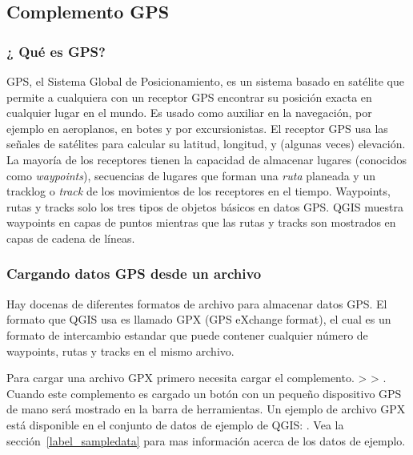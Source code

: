 
\subsection{Complemento GPS}\label{label_plugingps}


\subsubsection{¿ Qué es GPS?}\label{whatsgps}

GPS, el Sistema Global de Posicionamiento, es un sistema basado en satélite que permite a cualquiera con un receptor GPS encontrar su posición exacta en cualquier lugar en el mundo.
Es usado como auxiliar en la navegación, por ejemplo en aeroplanos, en botes y por excursionistas.
El receptor GPS usa las señales de satélites para calcular su latitud, longitud, y (algunas veces) elevación.
La mayoría de los receptores tienen la capacidad de almacenar lugares (conocidos como \emph{waypoints}), secuencias de lugares que forman una \emph{ruta} planeada y un tracklog o \emph{track} de los movimientos de los receptores en el tiempo.
Waypoints, rutas y tracks solo los tres tipos de objetos básicos en datos GPS.
QGIS muestra waypoints en capas de puntos mientras que las rutas y tracks son mostrados en capas de cadena de líneas.

\subsubsection{Cargando datos GPS desde un archivo}\label{label_loadgps}

Hay docenas de diferentes formatos de archivo para almacenar datos GPS.
El formato que QGIS usa es llamado GPX (GPS eXchange format), el cual es un formato de intercambio estandar que puede contener cualquier número de waypoints, rutas y tracks en el mismo archivo.

Para cargar una archivo GPX  primero necesita cargar el complemento.
 >  > . Cuando este complemento es cargado un botón con un pequeño dispositivo GPS de mano será mostrado en la barra de herramientas. Un ejemplo de archivo GPX está disponible en el conjunto de datos de ejemplo de QGIS:
. Vea 
la sección~\ref{label_sampledata} para mas información acerca de los datos de ejemplo.

